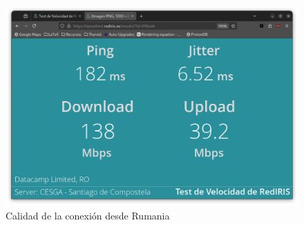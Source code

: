 \begin{figure}[H]
    \centering
    \includegraphics[width=\linewidth]{CalidadConexion-Rumania.png}
    \caption{Calidad de la conexión desde Rumania}
    \label{fig:Calidad-Conexión-Rumania}
\end{figure}



